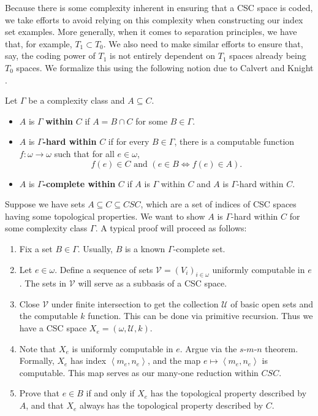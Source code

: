 \documentclass[11pt]{amsart}
\theoremstyle{remark}
\begin{document}
Because there is some complexity inherent in ensuring that a CSC space is coded, we take efforts to avoid relying on this complexity when constructing our index set examples.
More generally, when it comes to separation principles, we have that, for example, $T_1\subset T_0$.
We also need to make similar efforts to ensure that, say, the coding power of $T_1$ is not entirely dependent on $T_1$ spaces already being $T_0$ spaces.
We formalize this using the following notion due to Calvert and Knight \cite{WC05}.

\begin{definition}
    Let $\Gamma$ be a complexity class and $A \subseteq C$.
    \begin{itemize}
        \item $A$ is $\Gamma$ \textbf{within} $C$ if $A = B \cap C$ for some $B \in \Gamma$.
        \item $A$ is \textbf{$\Gamma$-hard within} $C$ if for every $B \in \Gamma$, there is a computable function $f: \omega \to \omega$ such that for all $e \in \omega$,
        \begin{equation*}
            \text{$f(e) \in C$ and $(e \in B \iff f(e) \in A)$}.
        \end{equation*}
        \item $A$ is \textbf{$\Gamma$-complete within} $C$ if $A$ is $\Gamma$ within $C$ and $A$ is $\Gamma$-hard within $C$.
    \end{itemize}
\end{definition}

Suppose we have sets $A\subseteq C \subseteq CSC$, which are a set of indices of CSC spaces having some topological properties. We want to show $A$ is $\Gamma$-hard within $C$ for some complexity class $\Gamma$. A typical proof will proceed as follows:
\begin{enumerate}
    \item Fix a set $B \in \Gamma$. Usually, $B$ is a known $\Gamma$-complete set.
    \item Let $e \in \omega$. Define a sequence of sets $\mathcal{V} = (V_i)_{i \in \omega}$ uniformly computable in $e$. The sets in $\mathcal{V}$ will serve as a subbasis of a CSC space.
    \item Close $\mathcal{V}$ under finite intersection to get the collection $\mathcal{U}$ of basic open sets and the computable $k$ function. This can be done via primitive recursion. Thus we have a CSC space $X_e = (\omega, \mathcal{U}, k)$.
    \item Note that $X_e$ is uniformly computable in $e$. Argue via the $s$-$m$-$n$ theorem. Formally, $X_e$ has index $\left\langle m_e, n_e \right\rangle$, and the map $e \mapsto \left\langle m_e, n_e\right\rangle$ is computable. This map serves as our many-one reduction within $CSC$.
    \item Prove that $e \in B$ if and only if $X_e$ has the topological property described by $A$, and that $X_e$ always has the topological property described by $C$.
\end{enumerate}
\end{document}

